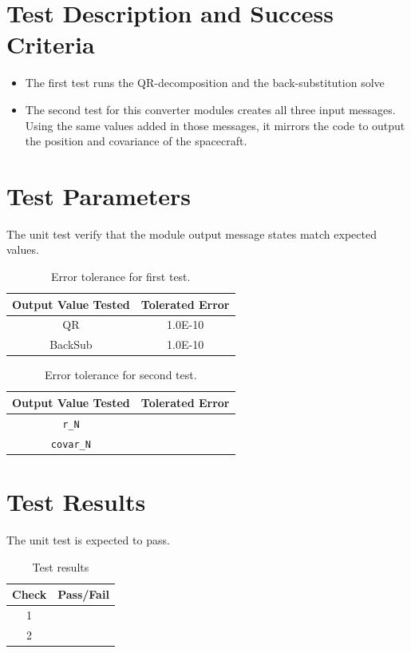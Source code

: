 
\section{Test Description and Success Criteria}
\begin{itemize}
\item The first test runs the QR-decomposition and the back-substitution solve
\item The second test for this converter modules creates all three input messages. Using the same values added in those messages, it mirrors the code to output the position and covariance of the spacecraft.
\end{itemize}
\section{Test Parameters}

The unit test verify that the module output message states match expected values.
\begin{table}[htbp]
	\caption{Error tolerance for first test.}
	\label{tab:errortol}
	\centering \fontsize{10}{10}\selectfont
	\begin{tabular}{ c | c } %
		\hline\hline
		\textbf{Output Value Tested}  & \textbf{Tolerated Error}  \\
		\hline
		QR             &  1.0E-10	   \\
		BackSub        & 1.0E-10   \\
		\hline\hline
	\end{tabular}
\end{table}

\begin{table}[htbp]
	\caption{Error tolerance for second test.}
	\label{tab:errortol}
	\centering \fontsize{10}{10}\selectfont
	\begin{tabular}{ c | c } %
		\hline\hline
		\textbf{Output Value Tested}  & \textbf{Tolerated Error}  \\
		\hline
		{\tt r\_N}        & 	   \\
		{\tt covar\_N}        & 	   \\
		\hline\hline
	\end{tabular}
\end{table}

\section{Test Results}
The unit test is expected to pass.
\begin{table}[H]
	\caption{Test results}
	\label{tab:results}
	\centering \fontsize{10}{10}\selectfont
	\begin{tabular}{c | c  } %
		\hline\hline
		\textbf{Check} &\textbf{Pass/Fail} \\
		\hline
	   1	   			&  \\
	   2	   			&  \\
	   \hline\hline
	\end{tabular}
\end{table}
